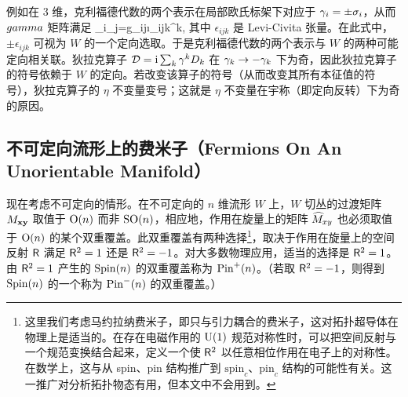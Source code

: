 例如在 3 维，克利福德代数的两个表示在局部欧氏标架下对应于 ${\gamma}_i=\pm \sigma_i$，从而 $\\gamma$ 矩阵满足
\be\label{zoffo}\g_i\g_j=g_{ij}\pm\i\epsilon_{ijk}\g^k, \ee
其中 $\epsilon_{ijk}$ 是 Levi-Civita 张量。在此式中，$\pm\epsilon_{ijk}$ 可视为 $W$ 的一个定向选取。于是克利福德代数的两个表示与 $W$ 的两种可能定向相关联。狄拉克算子 ${\mathcal D}={\mathrm i}\sum_k{\gamma}^k D_k$ 在 ${\gamma}_k\to -{\gamma}_k$ 下为奇，因此狄拉克算子的符号依赖于 $W$ 的定向。若改变该算子的符号（从而改变其所有本征值的符号），狄拉克算子的 $\eta$ 不变量变号；这就是 $\eta$ 不变量在宇称（即定向反转）下为奇的原因。


\subsection{不可定向流形上的费米子（Fermions On An Unorientable Manifold）}\label{unor}


现在考虑不可定向的情形。在不可定向的 $n$ 维流形 $W$ 上，$W$ 切丛的过渡矩阵 $M_{{\mathbf x}{\mathbf y}}$ 取值于 ${\mathrm O}(n)$ 而非 ${\mathrm{SO}}(n)$，相应地，作用在旋量上的矩阵 $\widehat M_{xy}$ 也必须取值于 ${\mathrm O}(n)$ 的某个双重覆盖。此双重覆盖有两种选择\footnote{这里我们考虑马约拉纳费米子，即只与引力耦合的费米子，这对拓扑超导体在物理上是适当的。在存在电磁作用的 ${\mathrm U}(1)$ 规范对称性时，可以把空间反射与一个规范变换结合起来，定义一个使 ${\sf R}^2$ 以任意相位作用在电子上的对称性。在数学上，这与从 spin、pin 结构推广到 $\mathrm{spin}_c$、$\mathrm{pin}_c$ 结构的可能性有关。这一推广对分析拓扑物态有用，但本文中不会用到。}，取决于作用在旋量上的空间反射 ${\sf R}$ 满足 ${\sf R}^2=1$ 还是 ${\sf R}^2=-1$。对大多数物理应用，适当的选择是 ${\sf R}^2=1$。由 ${\sf R}^2=1$ 产生的 ${\mathrm{Spin}}(n)$ 的双重覆盖称为 ${\mathrm{Pin}}^+(n)$。（若取 ${\sf R}^2=-1$，则得到 ${\mathrm{Spin}}(n)$ 的一个称为 ${\mathrm{Pin}}^-(n)$ 的双重覆盖。）

